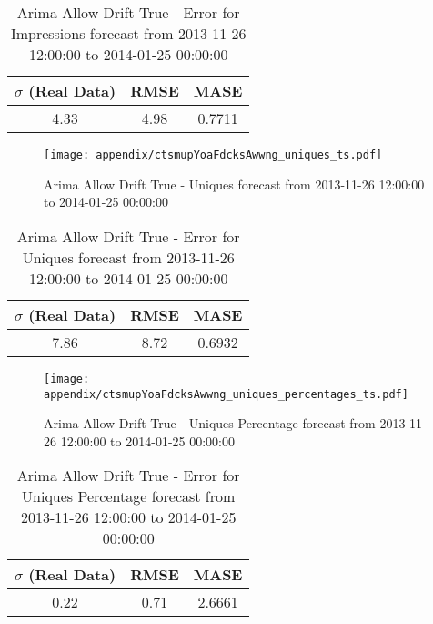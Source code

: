 \begin{table}[H]
\centering
\footnotesize
\begin{tabular}{ccc}
$\sigma$ (Real Data) & RMSE & MASE   \\ \hline
4.33 & 4.98 & 0.7711 \\
\end{tabular}

\vspace{0.5cm}

\caption{
Arima Allow Drift True - Error for Impressions forecast from 2013-11-26 12:00:00 to 2014-01-25 00:00:00}
\end{table}

\begin{figure}[H] \begin{center} \leavevmode
\texttt{[image: appendix/ctsmupYoaFdcksAwwng\_uniques\_ts.pdf]} \caption{
Arima Allow Drift True - Uniques forecast from 2013-11-26 12:00:00 to 2014-01-25 00:00:00} \label{fig:appendix/ctsmupYoaFdcksAwwng_uniques_ts.pdf} \end{center}
\end{figure}

\begin{table}[H]
\centering
\footnotesize
\begin{tabular}{ccc}
$\sigma$ (Real Data) & RMSE & MASE   \\ \hline
7.86 & 8.72 & 0.6932 \\
\end{tabular}

\vspace{0.5cm}

\caption{
Arima Allow Drift True - Error for Uniques forecast from 2013-11-26 12:00:00 to 2014-01-25 00:00:00}
\end{table}

\begin{figure}[H] \begin{center} \leavevmode
\texttt{[image: appendix/ctsmupYoaFdcksAwwng\_uniques\_percentages\_ts.pdf]} \caption{
Arima Allow Drift True - Uniques Percentage forecast from 2013-11-26 12:00:00 to 2014-01-25 00:00:00} \label{fig:appendix/ctsmupYoaFdcksAwwng_uniques_percentages_ts.pdf} \end{center}
\end{figure}

\begin{table}[H]
\centering
\footnotesize
\begin{tabular}{ccc}
$\sigma$ (Real Data) & RMSE & MASE   \\ \hline
0.22 & 0.71 & 2.6661 \\
\end{tabular}

\vspace{0.5cm}

\caption{
Arima Allow Drift True - Error for Uniques Percentage forecast from 2013-11-26 12:00:00 to 2014-01-25 00:00:00}
\end{table}

